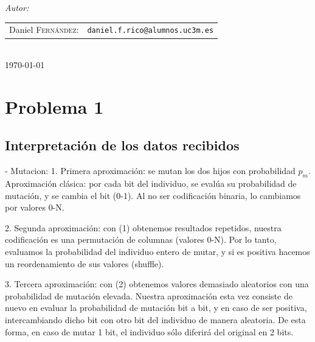 \documentclass[12pt]{article}
\begin{document}
\begin{titlepage}
\emph{Autor:}\\[0.7cm]

\begin{tabular}{rl}
    Daniel \textsc{Fernández}: &\texttt{daniel.f.rico@alumnos.uc3m.es}
\end{tabular}\\[2cm]



{\large \today}\\[3cm] %

\vfill %

\end{titlepage}

\tableofcontents

\newpage

\section{Problema 1}


\subsection{Interpretación de los datos recibidos}

- Mutacion:
1. Primera aproximación: se mutan los dos hijos con probabilidad $p_m$. Aproximación clásica: por cada bit del individuo, se evalúa su probabilidad de mutación, y se cambia el bit (0-1). Al no ser codificación binaria, lo cambiamos por valores 0-N.

2. Segunda aproximación: con (1) obtenemos resultados repetidos, nuestra codificación es una permutación de columnas (valores 0-N). Por lo tanto, evaluamos la probabilidad del individuo entero de mutar, y si es positiva hacemos un reordenamiento de sus valores (shuffle).

3. Tercera aproximación: con (2) obtenemos valores demasiado aleatorios con una probabilidad de mutación elevada. Nuestra aproximación esta vez consiste de nuevo en evaluar la probabilidad de mutación bit a bit, y en caso de ser positiva, intercambiando dicho bit con otro bit del individuo de manera aleatoria. De esta forma, en caso de mutar 1 bit, el individuo sólo diferirá del original en 2 bits.
\end{document}
